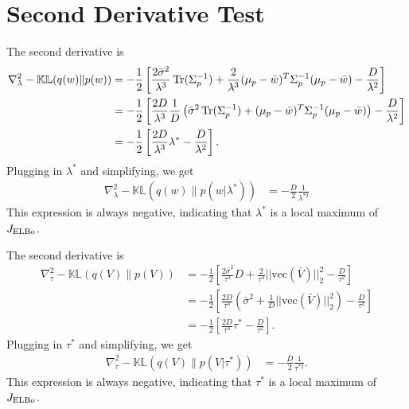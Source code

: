 \section{Second Derivative Test}
\label{sec:second_derivative_test}

The second derivative is
\begin{align}
    \nabla^2_\lambda -\mathbb{KL}(q(w) \| p(w)) &= -\frac{1}{2} \left[ \frac{2\bar{\sigma}^2}{\lambda^3} \operatorname{Tr}(\Sigma_p^{-1}) + \frac{2}{\lambda^3} (\mu_p - \bar{w})^T \Sigma_p^{-1} (\mu_p - \bar{w}) - \frac{D}{\lambda^2} \right] \\
    &= -\frac{1}{2} \left[ \frac{2D}{\lambda^3} \frac{1}{D} \left( \bar{\sigma}^2 \operatorname{Tr}(\Sigma_p^{-1}) + (\mu_p - \bar{w})^T \Sigma_p^{-1} (\mu_p - \bar{w}) \right) - \frac{D}{\lambda^2} \right] \\
    &= -\frac{1}{2} \left[ \frac{2D}{\lambda^3} \lambda^* - \frac{D}{\lambda^2} \right].
\end{align}
Plugging in $\lambda^*$ and simplifying, we get
\begin{align}
    \nabla^2_\lambda -\mathbb{KL}(q(w) \| p(w | \lambda^*)) &= -\frac{D}{2}  \frac{1}{\lambda^{*2}}
\end{align}
This expression is always negative, indicating that $\lambda^*$ is a local maximum of $J_{\text{ELBo}}$.

The second derivative is
\begin{align}
    \nabla_\tau^2 -\mathbb{KL}(q(V) \| p(V)) &= -\frac{1}{2} \left[ \frac{2\bar{\sigma}^2}{\tau^3} D + \frac{2}{\tau^3} || \text{vec}(\bar{V}) ||_2^2 - \frac{D}{\tau^2} \right] \\
    &= -\frac{1}{2} \left[  \frac{2D}{\tau^3}  \left( \bar{\sigma}^2 + \frac{1}{D} || \text{vec}(\bar{V}) ||_2^2 \right) - \frac{D}{\tau^2} \right] \\ 
    &= -\frac{1}{2} \left[  \frac{2D}{\tau^3} \tau^*  - \frac{D}{\tau^2} \right].
\end{align}
Plugging in $\tau^*$ and simplifying, we get
\begin{align}
    \nabla^2_\tau -\mathbb{KL}(q(V) \| p(V | \tau^*)) &= -\frac{D}{2}  \frac{1}{\tau^{*2}}.
\end{align}
This expression is always negative, indicating that $\tau^*$ is a local maximum of $J_{\text{ELBo}}$.
